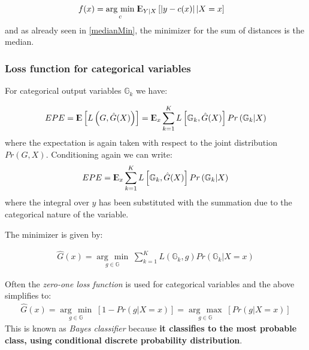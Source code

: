 \documentclass[12pt, letterpaper]{article}
\theoremstyle{definition}
\newcommand{\E}{{\rm I\kern-.3em E}}
\newcommand{\argmax}[1]{\underset{#1}{\operatorname{arg}\,\operatorname{max}}\;}
\newcommand{\argmin}[1]{\underset{#1}{\operatorname{arg}\,\operatorname{min}}\;}
\begin{document}
\begin{equation}
\begin{aligned}
f(x) &= \argmin{c} \E_{Y|X} \left[ \left| y - c(x) \right| | X=x \right]
\end{aligned}
\end{equation}
and as already seen in \ref{medianMin}, the minimizer for the sum of distances is the median.
\subsubsection{Loss function for categorical variables}
For categorical output variables $\mathbb{G}_k$ we have: 

\begin{equation}
\begin{aligned}
EPE = \E\left[ L\left( G, \hat{G}(X)\right)\right] = \E_x \sum_{k=1}^K L\left[ \mathbb{G}_k, \hat{G}(X)\right]Pr\left( \mathbb{G}_k|X\right)
\end{aligned}
\end{equation}
where the expectation is again taken with respect to the joint distribution $Pr(G,X)$. Conditioning again we can write:
\begin{equation}
\begin{aligned}
EPE = \E_x \sum_{k=1}^K L\left[ \mathbb{G}_k, \hat{G}(X)\right]Pr\left( \mathbb{G}_k|X\right)
\end{aligned}
\end{equation}
where the integral over $y$ has been substituted with the summation due to the categorical nature of the variable.

The minimizer is given by:

\begin{equation}
\begin{aligned}
\hat{G}(x) = \argmin{g \in \mathbb{G}} \sum_{k=1}^{K} L\left( \mathbb{G}_k, g\right)Pr\left( \mathbb{G}_k | X=x \right)
\end{aligned}
\end{equation}

Often the \textit{zero-one loss function} is used for categorical variables and the above simplifies to:
\begin{equation}
\begin{aligned}
\hat{G}(x) = \argmin{g \in \mathbb{G}}  \left[1 - Pr\left( g | X=x \right) \right] =\argmax{g \in \mathbb{G}}  \left[Pr\left( g | X=x \right) \right]
\end{aligned}
\end{equation}
This is known as \textit{Bayes classifier} because \textbf{it classifies to the most probable class, using conditional discrete probability distribution}.
\end{document}
